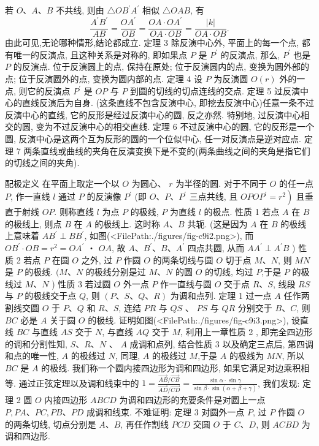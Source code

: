 若 $O 、 A 、 B$ 不共线, 则由 $\triangle O B^{\prime} A^{\prime}$ 相似 $\triangle O A B$, 有
$$
\frac{A^{\prime} B^{\prime}}{A B}=\frac{O A^{\prime}}{O B}=\frac{O A \cdot O A^{\prime}}{O A \cdot O B}=\frac{|k|}{O A \cdot O B} .
$$
由此可见,无论哪种情形,结论都成立.
定理 3 除反演中心外, 平面上的每一个点, 都有唯一的反演点, 且这种关系是对称的, 即如果点 $P$ 是 $P^{\prime}$ 的反演点, 那么, $P^{\prime}$ 也是 $P$ 的反演点.
位于反演圆上的点, 保持在原处; 位于反演圆内的点, 变换为圆外部的点; 位于反演圆外的点, 变换为圆内部的点.
定理 4 设 $P$ 为反演圆 $O(r)$ 外的一点, 则它的反演点 $P^{\prime}$ 是 $O P$ 与 $P$ 到圆的切线的切点连线的交点.
定理 5 过反演中心的直线反演后为自身.
(这条直线不包含反演中心, 即挖去反演中心)任意一条不过反演中心的直线, 它的反形是经过反演中心的圆, 反之亦然.
特别地, 过反演中心相交的圆, 变为不过反演中心的相交直线.
定理 6 不过反演中心的圆, 它的反形是一个圆, 反演中心是这两个互为反形的圆的一个位似中心, 任一对反演点是逆对应点.
定理 7 两条直线或曲线的夹角在反演变换下是不变的(两条曲线之间的夹角是指它们的切线之间的夹角).



配极定义 在平面上取定一个以 $O$ 为圆心、 $r$ 为半径的圆.
对于不同于 $O$ 的任一点 $P$, 作一直线 $l$ 通过 $P$ 的反演像 $P^{\prime}$ (即 $O 、 P 、 P^{\prime}$ 三点共线, 且 $O P \left.O P^{\prime}=r^2\right)$ 且垂直于射线 $O P$. 则称直线 $l$ 为点 $P$ 的极线, $P$ 为直线 $l$ 的极点.
性质 1 若点 $A$ 在 $B$ 的极线上, 则点 $B$ 在 $A$ 的极线上.
这时称 $A 、 B$ 共轭.
(这是因为 $A$ 在 $B$ 的极线上意味着 $A B^{\prime} \perp B B^{\prime}$, 如图(<FilePath:./figures/fig-c9i2.png>), 而 $O B^{\prime} \cdot O B=r^2=O A^{\prime}$ ・ $O A$, 故 $A 、 B^{\prime} 、 B 、 A^{\prime}$ 四点共圆, 从而 $A A^{\prime} \perp A^{\prime} B$ )
性质 2 若点 $P$ 在圆 $O$ 之外, 过 $P$ 作圆 $O$ 的两条切线与圆 $O$ 切于点 $M 、 N$, 则 $M N$ 是 $P$ 的极线.
$(M 、 N$ 的极线分别是过 $M 、 N$ 的圆 $O$ 的切线, 均过 $P$,于是 $P$ 的极线过 $M 、 N$ )
性质 3 若过圆 $O$ 外一点 $P$ 作一直线与圆 $O$ 交于点 $R 、 S$, 线段 $R S$ 与 $P$ 的极线交于点 $Q$, 则 $(P 、 S 、 Q 、 R)$ 为调和点列.
定理 1 过一点 $A$ 任作两割线交圆 $O$ 于 $P 、 Q$ 和 $R 、 S$, 连结 $P R$ 与 $Q S$ 、 $P S$ 与 $Q R$ 分别交于 $B 、 C$, 则 $B C$ 必是 $A$ 关于圆 $O$ 的极线.
证明如图(<FilePath:./figures/fig-c9i3.png>), 设直线 $B C$ 与直线 $A S$ 交于 $N$, 与直线 $A Q$ 交于 $M$, 利用上一章性质 2 , 即完全四边形的调和分割性知, $S 、 R 、 N$ 、 $A$ 成调和点列, 结合性质 3 以及确定三点后, 第四调和点的唯一性, $A$ 的极线过 $N$, 同理, $A$ 的极线过 $M$,于是 $A$ 的极线为 $M N$, 所以 $B C$ 是 $A$ 的极线.
我们称一个圆内接四边形为调和四边形, 如果它满足对边乘积相等.
通过正弦定理以及调和线束中的 $1=\frac{\overrightarrow{A B} / \overrightarrow{C B}}{\overrightarrow{A D} / \overrightarrow{C D}}=\frac{\sin \alpha \cdot \sin \gamma}{\sin \beta \cdot \sin (\alpha+\beta+\gamma)}$, 我们发现:
定理 2 圆 $O$ 内接四边形 $A B C D$ 为调和四边形的充要条件是对圆上一点 $P, P A 、 P C, P B 、 P D$ 成调和线束.
不难证明:
定理 3 对圆外一点 $P$, 过 $P$ 作圆 $O$ 的两条切线, 切点分别是 $A 、 B$, 再任作割线 $P C D$ 交圆 $O$ 于 $C 、 D$, 则 $A C B D$ 为调和四边形.



